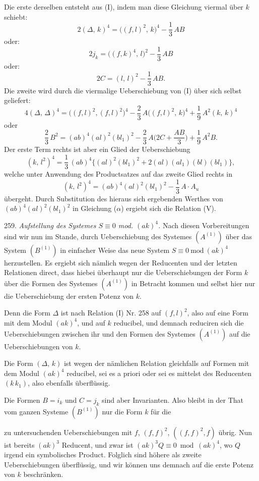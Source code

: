 \documentclass[11pt]{article}
\providecommand{\weberpage}[1]{}
\providecommand{\weq}[2]{\begin{equation}\tag{#1}#2\end{equation}}
\begin{document}
\weberpage{280}

Die erste derselben entsteht aus (I), indem man diese Gleichung viermal
über $k$ schiebt:
\[
2(\varDelta,\,k)^4 = \big((f,l)^2,\,k\big)^4 - \frac{1}{3}\,AB
\]
oder:
\[
2j_k = \big((f,k)^4,\,l\big)^2 - \frac{1}{3}\,AB
\]
oder:
\[
2C = (l,\,l)^2 - \frac{1}{3}\,AB.
\]
Die zweite wird durch die viermalige Ueberschiebung von (I) über sich
selbst geliefert:
\[
4(\varDelta,\,\varDelta)^4 = \big((f,l)^2,(f,l)^2\big)^4 -
\frac{2}{3}\,A\big((f,l)^2,\,k\big)^4 + \frac{1}{9}\,A^2(k,\,k)^4
\]
oder
\weq{$\alpha$}{\frac{2}{3}\,B^2 = (ab)^4(al)^2(bl_1)^2 - \frac{2}{3}\,A\Big(2C+\frac{AB}{3}\Big) + \frac{1}{9}\,A^2 B.}
Der erste Term rechts ist aber ein Glied der Ueberschiebung
\[
(k,\,l^2)^4 = \frac{1}{3}\,(ab)^4\big\{(al)^2(bl_1)^2 + 2(al)(al_1)(bl)(bl_1)\big\},
\]
welche unter Anwendung des Productsatzes auf das zweite Glied rechts in
\weq{$\beta$}{(k,\,l^2)^4 = (ab)^4(al)^2(bl_1)^2 - \frac{1}{3}\,A\cdot A_u}
übergeht. Durch Substitution des hieraus sich ergebenden Werthes von
$(ab)^4(al)^2(bl_1)^2$ in Gleichung ($\alpha$) ergiebt sich die
Relation (V).

259. \textit{Aufstellung des Systemes $S\equiv 0$ mod. $(ak)^4$.} Nach
diesen Vorbereitungen sind wir nun im Stande, durch Ueberschiebung des
Systemes $(A^{(1)})$ über das System $(B^{(1)})$ in einfacher Weise das
neue System $S\equiv 0\ \mathrm{mod}\ (ak)^4$ herzustellen. Es ergiebt
sich nämlich wegen der Reducenten und der letzten Relationen direct,
dass hiebei überhaupt nur die Ueberschiebungen der Form $k$ über die
Formen des Systemes $(A^{(1)})$ in Betracht kommen und selbst hier nur
die Ueberschiebung der ersten Potenz von $k$.

Denn die Form $\varDelta$ ist nach Relation (I) Nr. 258 auf $(f,l)^2$,
also auf eine Form mit dem Modul $(ak)^4$, und auf $k$ reducibel, und
demnach reduciren sich die Ueberschiebungen zwischen ihr und den Formen
des Systemes $(A^{(1)})$ auf die Ueberschiebungen von $k$.

Die Form $(\varDelta,\,k)$ ist wegen der nämlichen Relation gleichfalls
auf Formen mit dem Modul $(ak)^4$ reducibel, sei es a priori oder sei es
mittelst des Reducenten $(k\,k_1)$, also ebenfalls überflüssig.

Die Formen $B=i_k$ und $C=j_k$ sind aber Invarianten. Also bleibt in der
That vom ganzen Systeme $(B^{(1)})$ nur die Form $k$ für die


\weberpage{281}
zu untersuchenden Ueberschiebungen mit $f$, $(f, f)^2$, $((f, f)^2, f)$ übrig.
Nun ist bereits $(ak)^3$ Reducent, und zwar ist $(ak)^3 Q \equiv 0 \bmod (ak)^4$,
wo $Q$ irgend ein symbolisches Product. Folglich sind höhere als
zweite Ueberschiebungen überflüssig, und wir können uns demnach
auf die erste Potenz von $k$ beschränken.
\end{document}
